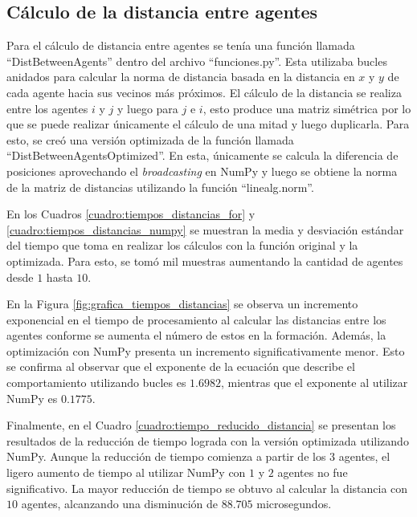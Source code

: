 \subsection{Cálculo de la distancia entre agentes}
Para el cálculo de distancia entre agentes se tenía una función llamada ``DistBetweenAgents'' dentro del archivo ``funciones.py''. Esta utilizaba bucles anidados para calcular la norma de distancia basada en la distancia en $x$ y $y$ de cada agente hacia sus vecinos más próximos. El cálculo de la distancia se realiza entre los agentes $i$ y $j$ y luego para $j$ e $i$, esto produce una matriz simétrica por lo que se puede realizar únicamente el cálculo de una mitad y luego duplicarla. Para esto, se creó una versión optimizada de la función llamada ``DistBetweenAgentsOptimized''. En esta, únicamente se calcula la diferencia de posiciones aprovechando el \textit{broadcasting} en NumPy y luego se obtiene la norma de la matriz de distancias utilizando la función ``linealg.norm''.

En los Cuadros \ref{cuadro:tiempos_distancias_for} y \ref{cuadro:tiempos_distancias_numpy} se muestran la media y desviación estándar del tiempo que toma en realizar los cálculos con la función original y la optimizada. Para esto, se tomó mil muestras aumentando la cantidad de agentes desde $1$ hasta $10$. 

En la Figura \ref{fig:grafica_tiempos_distancias} se observa un incremento exponencial en el tiempo de procesamiento al calcular las distancias entre los agentes conforme se aumenta el número de estos en la formación. Además, la optimización con NumPy presenta un incremento significativamente menor. Esto se confirma al observar que el exponente de la ecuación que describe el comportamiento utilizando bucles es $1.6982$, mientras que el exponente al utilizar NumPy es $0.1775$.

Finalmente, en el Cuadro \ref{cuadro:tiempo_reducido_distancia} se presentan los resultados de la reducción de tiempo lograda con la versión optimizada utilizando NumPy. Aunque la reducción de tiempo comienza a partir de los $3$ agentes, el ligero aumento de tiempo al utilizar NumPy con $1$ y $2$ agentes no fue significativo. La mayor reducción de tiempo se obtuvo al calcular la distancia con $10$ agentes, alcanzando una disminución de $88.705$ microsegundos.

